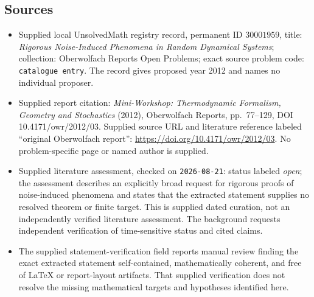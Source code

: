 \documentclass[11pt]{article}
\begin{document}
\subsection{Sources}
\begin{itemize}
\item Supplied local UnsolvedMath registry record, permanent ID \(30001959\), title: \emph{Rigorous Noise-Induced Phenomena in Random Dynamical Systems}; collection: Oberwolfach Reports Open Problems; exact source problem code: \texttt{catalogue entry}. The record gives proposed year 2012 and names no individual proposer.
\item Supplied report citation: \emph{Mini-Workshop: Thermodynamic Formalism, Geometry and Stochastics} (2012), Oberwolfach Reports, pp.\ 77--129, DOI 10.4171/owr/2012/03. Supplied source URL and literature reference labeled ``original Oberwolfach report'': \url{https://doi.org/10.4171/owr/2012/03}. No problem-specific page or named author is supplied.
\item Supplied literature assessment, checked on \texttt{2026-08-21}: status labeled \emph{open}; the assessment describes an explicitly broad request for rigorous proofs of noise-induced phenomena and states that the extracted statement supplies no resolved theorem or finite target. This is supplied dated curation, not an independently verified literature assessment. The background requests independent verification of time-sensitive status and cited claims.
\item The supplied statement-verification field reports manual review finding the exact extracted statement self-contained, mathematically coherent, and free of LaTeX or report-layout artifacts. That supplied verification does not resolve the missing mathematical targets and hypotheses identified here.
\end{itemize}
\end{document}
